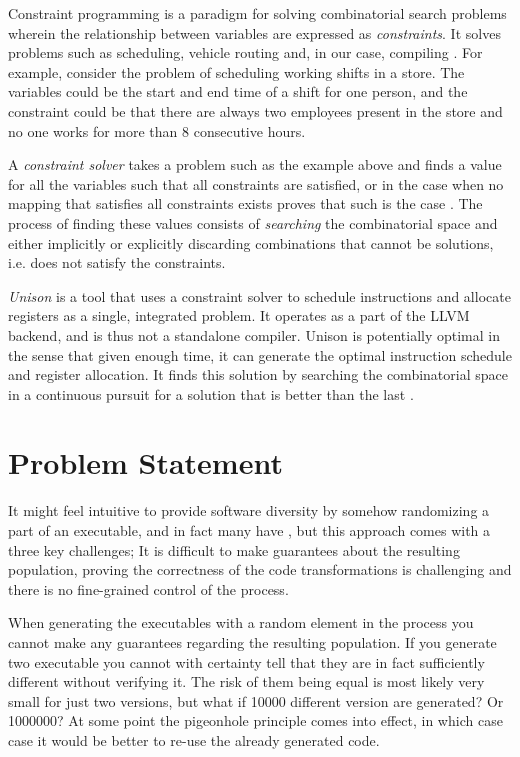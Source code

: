 Constraint programming is a paradigm for solving combinatorial search problems wherein
the relationship between variables are expressed as \textit{constraints}. It solves problems
such as scheduling, vehicle routing and, in our case, compiling
 \cite{handbook-constraint-programming, unison-docs}. For example, consider the problem
of scheduling working shifts in a store. The variables could be the start and end time
of a shift for one person, and the constraint could be that there are always two employees
present in the store and no one works for more than 8 consecutive hours.

A \textit{constraint solver} takes a problem such as the example above and finds a value
for all the variables such that all constraints are satisfied, or in the case when no
mapping that satisfies all constraints exists proves that such is the case
 \cite{handbook-constraint-programming}. The process of finding these values consists of
\textit{searching} the combinatorial space and either implicitly or explicitly discarding
combinations that cannot be solutions, i.e. does not satisfy the constraints.

\textit{Unison} is a tool that uses a constraint solver to schedule instructions and allocate
registers as a single, integrated problem. It operates as a part of the LLVM backend, and
is thus not a standalone compiler. Unison is potentially optimal in the sense that given
enough time, it can generate the optimal instruction schedule and register allocation.
It finds this solution by searching the combinatorial space in a continuous pursuit for a
solution that is better than the last \cite{unison-docs}.

\section{Problem Statement}

It might feel intuitive to provide software diversity by somehow randomizing a part of an
executable, and in fact many have \cite{survey,librando,binary-stirring}, but this
approach comes with a three key challenges; It is difficult to make guarantees about the
resulting population, proving the correctness of the code transformations is challenging
and there is no fine-grained control of the process.

When generating the executables with a random element in the process you cannot make any
guarantees regarding the resulting population. If you generate two executable you cannot
with certainty tell that they are in fact sufficiently different without verifying it. The
risk of them being equal is most likely very small for just two versions, but what if
10000 different version are generated? Or 1000000? At some point the pigeonhole principle
comes into effect, in which case case it would be better to re-use the already generated
code.

